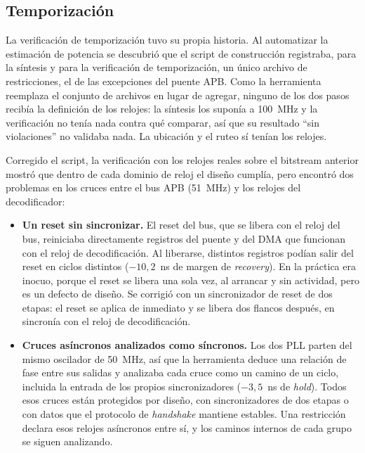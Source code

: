 \subsection{Temporización}
\label{sec:temporizacion}

La verificación de temporización tuvo su propia historia. Al automatizar la
estimación de potencia se descubrió que el script de construcción registraba,
para la síntesis y para la verificación de temporización, un único archivo
de restricciones, el de las excepciones del puente APB. Como la herramienta
reemplaza el conjunto de archivos en lugar de agregar, ninguno de los dos
pasos recibía la definición de los relojes: la síntesis los suponía a
100~MHz y la verificación no tenía nada contra qué comparar, así que su
resultado \enquote{sin violaciones} no validaba nada. La ubicación y el ruteo
sí tenían los relojes.

Corregido el script, la verificación con los relojes reales sobre el
bitstream anterior mostró que dentro de cada dominio de reloj el diseño
cumplía, pero encontró dos problemas en los cruces entre el bus APB
(51~MHz) y los relojes del decodificador:

\begin{itemize}
  \item \textbf{Un reset sin sincronizar.} El reset del bus, que se libera
    con el reloj del bus, reiniciaba directamente registros del puente y del
    DMA que funcionan con el reloj de decodificación. Al liberarse, distintos
    registros podían salir del reset en ciclos distintos ($-10{,}2$~ns de
    margen de \emph{recovery}). En la práctica era inocuo, porque el reset se
    libera una sola vez, al arrancar y sin actividad, pero es un defecto de
    diseño. Se corrigió con un sincronizador de reset de dos etapas: el reset
    se aplica de inmediato y se libera dos flancos después, en sincronía con
    el reloj de decodificación.
  \item \textbf{Cruces asíncronos analizados como síncronos.} Los dos PLL
    parten del mismo oscilador de 50~MHz, así que la herramienta deduce una
    relación de fase entre sus salidas y analizaba cada cruce como un camino
    de un ciclo, incluida la entrada de los propios sincronizadores
    ($-3{,}5$~ns de \emph{hold}). Todos esos cruces están protegidos por
    diseño, con sincronizadores de dos etapas o con datos que el protocolo
    de \emph{handshake} mantiene estables. Una restricción
     declara esos relojes asíncronos
    entre sí, y los caminos internos de cada grupo se siguen analizando.
\end{itemize}

